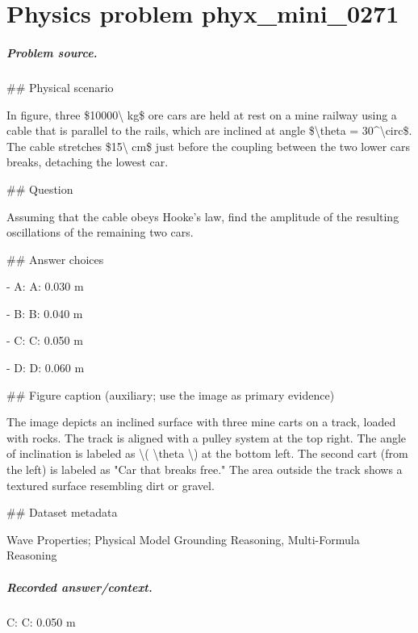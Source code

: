 
\chapter{Physics problem phyx\_mini\_0271}
\label{ch:PhyXMiniProblems_problem_phyx_mini_0271}

\paragraph{Problem source.}
\#\# Physical scenario

In figure, three \$10000\textbackslash{} kg\$ ore cars are held at rest on a mine railway using a cable that is parallel to the rails, which are inclined at angle \$\textbackslash{}theta = 30\textasciicircum{}\textbackslash{}circ\$. The cable stretches \$15\textbackslash{} cm\$ just before the coupling between the two lower cars breaks, detaching the lowest car.

\#\# Question

Assuming that the cable obeys Hooke's law, find the amplitude of the resulting oscillations of the remaining two cars.

\#\# Answer choices

- A: A: 0.030 m

- B: B: 0.040 m

- C: C: 0.050 m

- D: D: 0.060 m

\#\# Figure caption (auxiliary; use the image as primary evidence)

The image depicts an inclined surface with three mine carts on a track, loaded with rocks. The track is aligned with a pulley system at the top right. The angle of inclination is labeled as \textbackslash{}( \textbackslash{}theta \textbackslash{}) at the bottom left. The second cart (from the left) is labeled as "Car that breaks free." The area outside the track shows a textured surface resembling dirt or gravel.

\#\# Dataset metadata

Wave Properties; Physical Model Grounding Reasoning, Multi-Formula Reasoning

\paragraph{Recorded answer/context.}
C: C: 0.050 m

